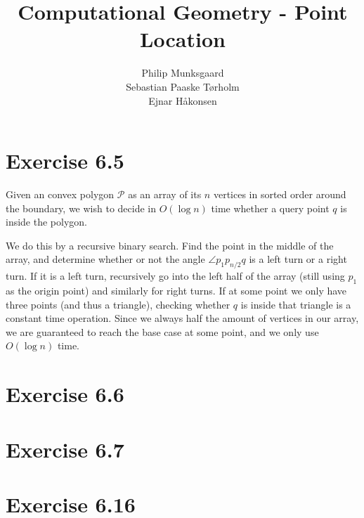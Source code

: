 \documentclass[11pt,a4paper]{article}
\title{Computational Geometry - Point Location}
\author{Philip Munksgaard \\ Sebastian Paaske Tørholm \\ Ejnar Håkonsen}
\begin{document}
\maketitle

\section{Exercise 6.5}

Given an convex polygon $\mathcal{P}$ as an array of its $n$ vertices
in sorted order around the boundary, we wish to decide in $O(\log n)$
time whether a query point $q$ is inside the polygon.

We do this by a recursive binary search. Find the point in the middle
of the array, and determine whether or not the angle $\angle p_1
p_{n/2} q$ is a left turn or a right turn. If it is a left turn,
recursively go into the left half of the array (still using $p_1$ as
the origin point) and similarly for right turns. If at some point we
only have three points (and thus a triangle), checking whether $q$ is
inside that triangle is a constant time operation. Since we always
half the amount of vertices in our array, we are guaranteed to reach
the base case at some point, and we only use $O(\log n)$ time.

\section{Exercise 6.6}

\section{Exercise 6.7}

\section{Exercise 6.16}
\end{document}
